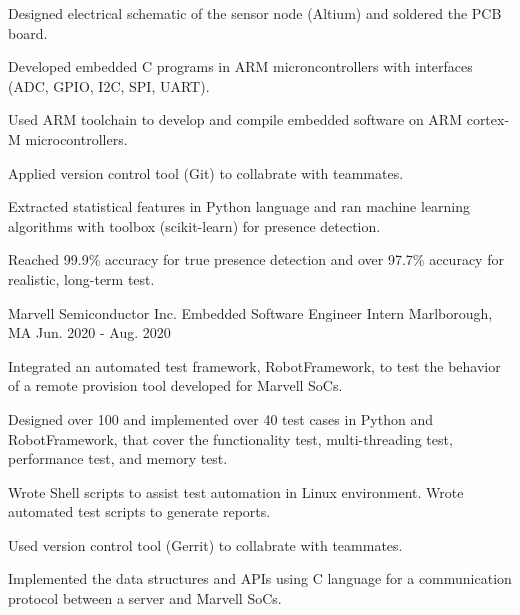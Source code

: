 \begin{cventries}
{\begin{cvitems}
        \item Designed electrical schematic of the sensor node (Altium) and soldered the PCB board.
        \item Developed embedded C programs in ARM microncontrollers with interfaces (ADC, GPIO, I2C, SPI, UART).
        \item Used ARM toolchain to develop and compile embedded software on ARM cortex-M microcontrollers.
        \item Applied version control tool (Git) to collabrate with teammates.
        \item Extracted statistical features in Python language and ran machine learning algorithms with toolbox (scikit-learn) for presence detection.
        \item Reached 99.9\% accuracy for true presence detection and over 97.7\% accuracy for realistic, long-term test. 
      \end{cvitems}
    }
  \cventry
  {Marvell Semiconductor Inc.} 
  {Embedded Software Engineer Intern} %
  {Marlborough, MA} %
  {Jun. 2020 - Aug. 2020} %
  {
    \begin{cvitems} %
      \item Integrated an automated test framework, RobotFramework, to test the behavior of a remote provision tool developed for Marvell SoCs.
      \item Designed over 100 and implemented over 40 test cases in Python and RobotFramework, that cover the functionality test, multi-threading test, performance test, and memory test.
      \item Wrote Shell scripts to assist test automation in Linux environment. Wrote automated test scripts to generate reports.
      \item Used version control tool (Gerrit) to collabrate with teammates.
      \item Implemented the data structures and APIs using C language for a communication protocol between a server and Marvell SoCs.
    \end{cvitems}
  }

  


\end{cventries}

